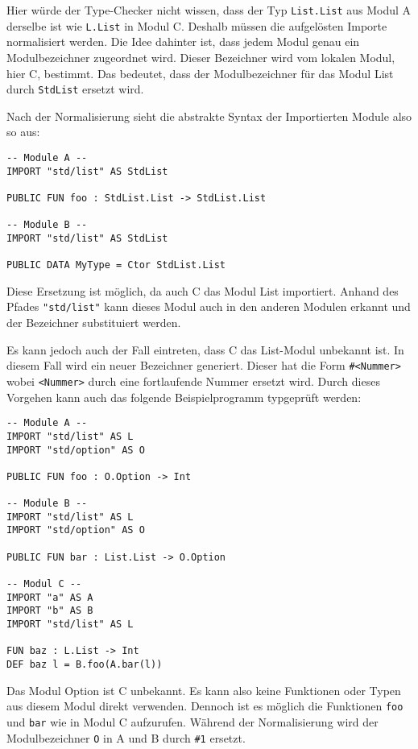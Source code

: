 \documentclass[runningheads]{llncs}
\begin{document}
Hier würde der Type-Checker nicht wissen, dass der Typ \verb|List.List| aus Modul A derselbe ist wie \verb|L.List| in Modul C. Deshalb müssen die aufgelösten Importe normalisiert werden. Die Idee dahinter ist, dass jedem Modul genau ein Modulbezeichner zugeordnet wird. Dieser Bezeichner wird vom lokalen Modul, hier C, bestimmt. Das bedeutet, dass der Modulbezeichner für das Modul List durch \verb|StdList| ersetzt wird.

Nach der Normalisierung sieht die abstrakte Syntax der Importierten Module also so aus:

\begin{verbatim}
-- Module A --
IMPORT "std/list" AS StdList

PUBLIC FUN foo : StdList.List -> StdList.List

-- Module B --
IMPORT "std/list" AS StdList

PUBLIC DATA MyType = Ctor StdList.List
\end{verbatim}

Diese Ersetzung ist möglich, da auch C das Modul List importiert. Anhand des Pfades \verb|"std/list"| kann dieses Modul auch in den anderen Modulen erkannt und der Bezeichner substituiert werden.

Es kann jedoch auch der Fall eintreten, dass C das List-Modul unbekannt ist. In diesem Fall wird ein neuer Bezeichner generiert. Dieser hat die Form \verb|#<Nummer>| wobei \verb|<Nummer>| durch eine fortlaufende Nummer ersetzt wird. Durch dieses Vorgehen kann auch das folgende Beispielprogramm typgeprüft werden:


\begin{verbatim}
-- Module A --
IMPORT "std/list" AS L
IMPORT "std/option" AS O

PUBLIC FUN foo : O.Option -> Int

-- Module B --
IMPORT "std/list" AS L
IMPORT "std/option" AS O

PUBLIC FUN bar : List.List -> O.Option

-- Modul C --
IMPORT "a" AS A
IMPORT "b" AS B
IMPORT "std/list" AS L

FUN baz : L.List -> Int
DEF baz l = B.foo(A.bar(l))
\end{verbatim}

Das Modul Option ist C unbekannt. Es kann also keine Funktionen oder Typen aus diesem Modul direkt verwenden. Dennoch ist es möglich die Funktionen \verb|foo| und \verb|bar| wie in Modul C aufzurufen. Während der Normalisierung wird der Modulbezeichner \verb|O| in A und B durch \verb|#1| ersetzt.
\end{document}

